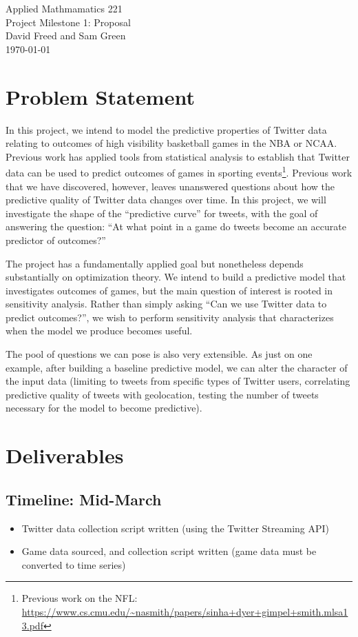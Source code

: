 \documentclass[12pt]{article}
\begin{document}
\begin{center}
{\Large Applied Mathmamatics 221}\\
Project Milestone 1: Proposal\\
David Freed and Sam Green\\
\today
\end{center}

\section{Problem Statement}

In this project, we intend to model the predictive properties of Twitter data relating to outcomes of high visibility basketball games in the NBA or NCAA. Previous work has applied tools from statistical analysis to establish that Twitter data can be used to predict outcomes of games in sporting events\footnote{Previous work on the NFL: \url{https://www.cs.cmu.edu/~nasmith/papers/sinha+dyer+gimpel+smith.mlsa13.pdf}}. Previous work that we have discovered, however, leaves unanswered questions about how the predictive quality of Twitter data changes over time. In this project, we will investigate the shape of the ``predictive curve'' for tweets, with the goal of answering the question: ``At what point in a game do tweets become an accurate predictor of outcomes?''

The project has a fundamentally applied goal but nonetheless depends substantially
on optimization theory. We intend to build a predictive model that investigates
outcomes of games, but the main question of interest is rooted in sensitivity
analysis. Rather than simply asking ``Can we use Twitter data to predict outcomes?'',
we wish to perform sensitivity analysis that characterizes when the model 
we produce becomes useful. 

The pool of questions we can pose is also very extensible. As just on
one example, after building 
a baseline predictive model, we can alter the character of the input data
(limiting to tweets from specific types of Twitter users, correlating predictive
quality of tweets with geolocation, testing the number of tweets necessary 
for the model to become predictive).  

\section{Deliverables}

\subsection{Timeline: Mid-March}  
\begin{itemize}
\item Twitter data collection script written (using the Twitter Streaming API)
\item Game data sourced, and collection script written (game data must be converted to time series)
\end{itemize} 
\end{document}
